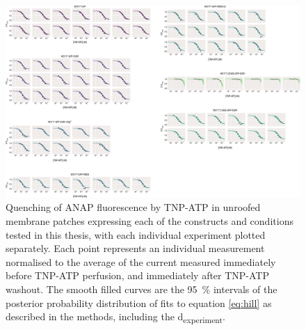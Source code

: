 \begin{figure}[h]
	\centering
	\includegraphics[width=\textwidth]{all_unroofed_fits_2.pdf}
	\caption[Unroofed membrane quenching sample hill fits]{
	Quenching of ANAP fluorescence by TNP-ATP in unroofed membrane patches expressing each of the constructs and conditions tested in this thesis, with each individual experiment plotted separately.
	Each point represents an individual measurement normalised to the average of the current measured immediately before TNP-ATP perfusion, and immediately after TNP-ATP washout.
	The smooth filled curves are the \SI{95}{\percent} intervals of the posterior probability distribution of fits to equation \ref{eq:hill} as described in the methods, including the \textgreek{d}\textsubscript{experiment}.
	}
	\label{apxfig:unroofed_2}
\end{figure}

